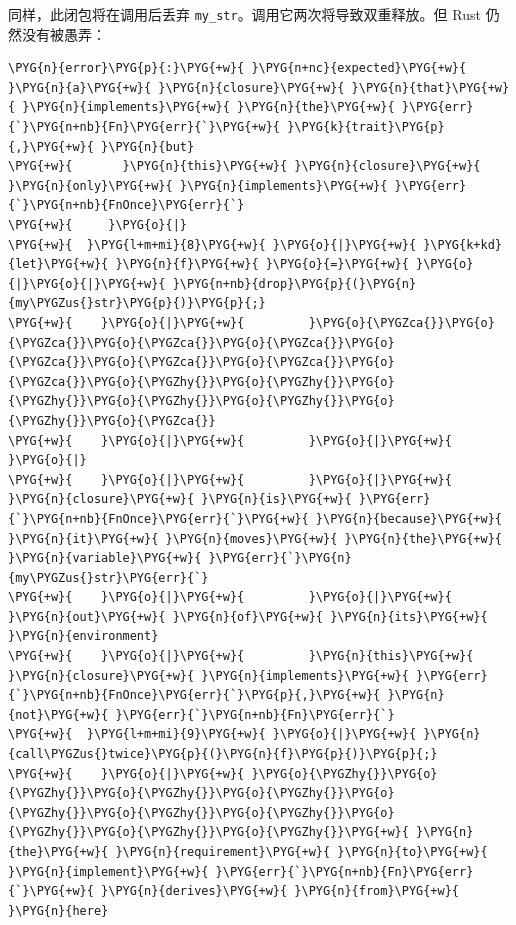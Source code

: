 同样，此闭包将在调用后丢弃 \texttt{my\_str}。调用它两次将导致双重释放。但 Rust 仍然没有被愚弄：

\begin{Verbatim}[commandchars=\\\{\},breaklines=true,breakanywhere=true,fontsize=\codefont,xleftmargin=17bp]
\PYG{n}{error}\PYG{p}{:}\PYG{+w}{ }\PYG{n+nc}{expected}\PYG{+w}{ }\PYG{n}{a}\PYG{+w}{ }\PYG{n}{closure}\PYG{+w}{ }\PYG{n}{that}\PYG{+w}{ }\PYG{n}{implements}\PYG{+w}{ }\PYG{n}{the}\PYG{+w}{ }\PYG{err}{`}\PYG{n+nb}{Fn}\PYG{err}{`}\PYG{+w}{ }\PYG{k}{trait}\PYG{p}{,}\PYG{+w}{ }\PYG{n}{but}
\PYG{+w}{       }\PYG{n}{this}\PYG{+w}{ }\PYG{n}{closure}\PYG{+w}{ }\PYG{n}{only}\PYG{+w}{ }\PYG{n}{implements}\PYG{+w}{ }\PYG{err}{`}\PYG{n+nb}{FnOnce}\PYG{err}{`}
\PYG{+w}{     }\PYG{o}{|}
\PYG{+w}{  }\PYG{l+m+mi}{8}\PYG{+w}{ }\PYG{o}{|}\PYG{+w}{ }\PYG{k+kd}{let}\PYG{+w}{ }\PYG{n}{f}\PYG{+w}{ }\PYG{o}{=}\PYG{+w}{ }\PYG{o}{|}\PYG{o}{|}\PYG{+w}{ }\PYG{n+nb}{drop}\PYG{p}{(}\PYG{n}{my\PYGZus{}str}\PYG{p}{)}\PYG{p}{;}
\PYG{+w}{    }\PYG{o}{|}\PYG{+w}{         }\PYG{o}{\PYGZca{}}\PYG{o}{\PYGZca{}}\PYG{o}{\PYGZca{}}\PYG{o}{\PYGZca{}}\PYG{o}{\PYGZca{}}\PYG{o}{\PYGZca{}}\PYG{o}{\PYGZca{}}\PYG{o}{\PYGZca{}}\PYG{o}{\PYGZhy{}}\PYG{o}{\PYGZhy{}}\PYG{o}{\PYGZhy{}}\PYG{o}{\PYGZhy{}}\PYG{o}{\PYGZhy{}}\PYG{o}{\PYGZhy{}}\PYG{o}{\PYGZca{}}
\PYG{+w}{    }\PYG{o}{|}\PYG{+w}{         }\PYG{o}{|}\PYG{+w}{       }\PYG{o}{|}
\PYG{+w}{    }\PYG{o}{|}\PYG{+w}{         }\PYG{o}{|}\PYG{+w}{       }\PYG{n}{closure}\PYG{+w}{ }\PYG{n}{is}\PYG{+w}{ }\PYG{err}{`}\PYG{n+nb}{FnOnce}\PYG{err}{`}\PYG{+w}{ }\PYG{n}{because}\PYG{+w}{ }\PYG{n}{it}\PYG{+w}{ }\PYG{n}{moves}\PYG{+w}{ }\PYG{n}{the}\PYG{+w}{ }\PYG{n}{variable}\PYG{+w}{ }\PYG{err}{`}\PYG{n}{my\PYGZus{}str}\PYG{err}{`}
\PYG{+w}{    }\PYG{o}{|}\PYG{+w}{         }\PYG{o}{|}\PYG{+w}{       }\PYG{n}{out}\PYG{+w}{ }\PYG{n}{of}\PYG{+w}{ }\PYG{n}{its}\PYG{+w}{ }\PYG{n}{environment}
\PYG{+w}{    }\PYG{o}{|}\PYG{+w}{         }\PYG{n}{this}\PYG{+w}{ }\PYG{n}{closure}\PYG{+w}{ }\PYG{n}{implements}\PYG{+w}{ }\PYG{err}{`}\PYG{n+nb}{FnOnce}\PYG{err}{`}\PYG{p}{,}\PYG{+w}{ }\PYG{n}{not}\PYG{+w}{ }\PYG{err}{`}\PYG{n+nb}{Fn}\PYG{err}{`}
\PYG{+w}{  }\PYG{l+m+mi}{9}\PYG{+w}{ }\PYG{o}{|}\PYG{+w}{ }\PYG{n}{call\PYGZus{}twice}\PYG{p}{(}\PYG{n}{f}\PYG{p}{)}\PYG{p}{;}
\PYG{+w}{    }\PYG{o}{|}\PYG{+w}{ }\PYG{o}{\PYGZhy{}}\PYG{o}{\PYGZhy{}}\PYG{o}{\PYGZhy{}}\PYG{o}{\PYGZhy{}}\PYG{o}{\PYGZhy{}}\PYG{o}{\PYGZhy{}}\PYG{o}{\PYGZhy{}}\PYG{o}{\PYGZhy{}}\PYG{o}{\PYGZhy{}}\PYG{o}{\PYGZhy{}}\PYG{+w}{ }\PYG{n}{the}\PYG{+w}{ }\PYG{n}{requirement}\PYG{+w}{ }\PYG{n}{to}\PYG{+w}{ }\PYG{n}{implement}\PYG{+w}{ }\PYG{err}{`}\PYG{n+nb}{Fn}\PYG{err}{`}\PYG{+w}{ }\PYG{n}{derives}\PYG{+w}{ }\PYG{n}{from}\PYG{+w}{ }\PYG{n}{here}
\end{Verbatim}

